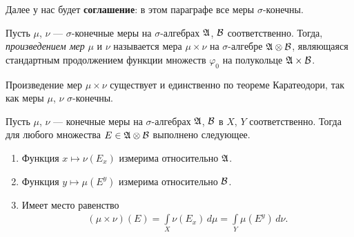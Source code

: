 Далее у нас будет \textbf{соглашение}: в этом параграфе все меры $\sigma$-конечны.

\begin{df}
 \label{definition:measure_product}
 Пусть $\mu$, $\nu$ --- $\sigma$-конечные меры на $\sigma$-алгебрах $\mathfrak{A}$, $\mathcal{B}$ соответственно. Тогда, \textit{произведением мер} $\mu$ и $\nu$ называется мера $\mu \times \nu$ на $\sigma$-алгебре $\mathfrak{A} \otimes \mathcal{B}$, являющаяся стандартным продолжением функции множеств $\varphi_0$ на полукольце $\mathfrak{A} \times \mathcal{B}$.
\end{df}
\begin{remrk*}
 Произведение мер $\mu \times \nu$ существует и единственно по теореме Каратеодори, так как меры $\mu$, $\nu$ $\sigma$-конечны.
\end{remrk*}

\begin{thm}
\label{theorem:principle_cavalieri} 

Пусть $\mu$, $\nu$ --- конечные меры на  $\sigma$-алгебрах $\mathfrak{A}$, $\mathcal{B}$  в $X$, $Y$ соответственно. Тогда для любого множества  $E \in \mathfrak{A} \otimes \mathcal{B}$  выполнено следующее.
\begin{enumerate}
 \item Функция $x \mapsto \nu(E_x)$  измерима относительно $\mathfrak{A}$.
 \label{enum1:theorem:principle_cavalieri}
 \item Функция $y \mapsto \mu(E^{y})$  измерима относительно $\mathcal{B}$.
 \label{enum2:theorem:principle_cavalieri}
\item Имеет место равенство \begin{align*}
   (\mu \times \nu)(E) = \int\limits_{X} \nu(E_x) \, d\mu = \int\limits_{Y} \mu(E^{y}) \, d\nu
 .\end{align*} 
 \label{enum3:theorem:principle_cavalieri}
\end{enumerate}
\end{thm}

